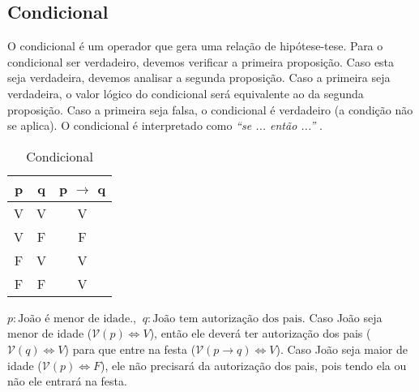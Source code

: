 \subsection*{Condicional}
O condicional é um operador que gera uma relação de hipótese-tese. Para o condicional ser verdadeiro, devemos verificar a primeira proposição. Caso esta seja verdadeira, devemos analisar a segunda proposição. Caso a primeira seja verdadeira, o valor lógico do condicional será equivalente ao da segunda proposição. Caso a primeira seja falsa, o condicional é verdadeiro (a condição não se aplica). O condicional é interpretado como \textit{``se ... então ...''} .
\begin{table}[H]
\centering
\caption{Condicional}
\label{ifso}
\begin{tabular}{c|c|c}
\textbf{p} & \textbf{q} & \textbf{p $\rightarrow$ q} \\ \hline
V          & V          & V             \\
V          & F          & F             \\
F          & V          & V             \\
F          & F          & V            
\end{tabular}
\end{table}
\begin{exemplo}
$p: \text{João é menor de idade}.$, $\: q: \text{João tem autorização dos pais}$. Caso João seja menor de idade ($\mathcal{V}(p) \Leftrightarrow V$), então ele deverá ter autorização dos pais ($\mathcal{V}(q) \Leftrightarrow V$) para que entre na festa ($\mathcal{V}\left( p \rightarrow q\right) \Leftrightarrow V$). Caso João seja maior de idade ($\mathcal{V}(p) \Leftrightarrow F$), ele não precisará da autorização dos pais, pois tendo ela ou não ele entrará na festa.
\end{exemplo}

